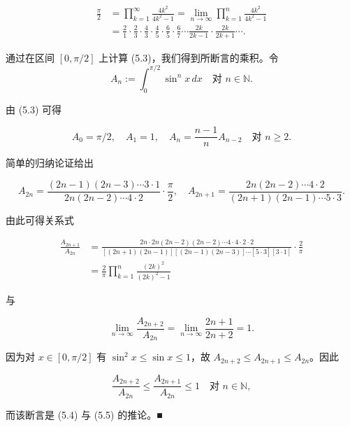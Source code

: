 \begin{example}
\begin{items}
\begin{equation*}
\begin{aligned}
\frac{\pi}{2} &= \prod_{k=1}^{\infty} \frac{4k^2}{4k^2 - 1} = \lim_{n \to \infty} \prod_{k=1}^{n} \frac{4k^2}{4k^2 - 1} \\ &= \frac{2}{1} \cdot \frac{2}{3} \cdot \frac{4}{3} \cdot \frac{4}{5} \cdot \frac{6}{5} \cdot \frac{6}{7} \cdots \frac{2k}{2k-1} \cdot \frac{2k}{2k+1} \cdots .
\end{aligned}
\end{equation*}

\proofhead
通过在区间 $ [0, \pi/2] $ 上计算 (5.3)，我们得到所断言的乘积。令
\[
A_n := \int_{0}^{\pi/2} \sin^n x \, dx \quad \text{对 } n \in \mathbb{N} .
\]

由 (5.3) 可得

\[
A_0 = \pi/2 , \quad A_1 = 1 , \quad A_n = \frac{n-1}{n} A_{n-2} \quad \text{对 } n \ge 2 .
\]

简单的归纳论证给出

\[
A_{2n} = \frac{(2n-1)(2n-3) \cdots 3 \cdot 1}{2n(2n-2) \cdots 4 \cdot 2} \cdot \frac{\pi}{2} , \quad A_{2n+1} = \frac{2n(2n-2) \cdots 4 \cdot 2}{(2n+1)(2n-1) \cdots 5 \cdot 3} .
\]

由此可得关系式

\begin{equation}
\begin{aligned}
\frac{A_{2n+1}}{A_{2n}} &= \frac{2n \cdot 2n (2n-2)(2n-2) \cdots 4 \cdot 4 \cdot 2 \cdot 2}{[(2n+1)(2n-1)][(2n-1)(2n-3)] \cdots [5 \cdot 3][3 \cdot 1]} \cdot \frac{2}{\pi} \\ &= \frac{2}{\pi} \prod_{k=1}^{n} \frac{(2k)^2}{(2k)^2 - 1}
\end{aligned}\tag{5.4}
\end{equation}

与

\begin{equation}
\lim_{n \to \infty} \frac{A_{2n+2}}{A_{2n}} = \lim_{n \to \infty} \frac{2n+1}{2n+2} = 1 .\tag{5.5}
\end{equation}

因为对 $ x \in [0, \pi/2] $ 有 $ \sin^2 x \le \sin x \le 1 $，故 $ A_{2n+2} \le A_{2n+1} \le A_{2n} $。因此

\[
\frac{A_{2n+2}}{A_{2n}} \le \frac{A_{2n+1}}{A_{2n}} \le 1 \quad \text{对 } n \in \mathbb{N} ,
\]

而该断言是 (5.4) 与 (5.5) 的推论。\nobreak\hspace{0.35em}■

\end{items}

\end{example}

